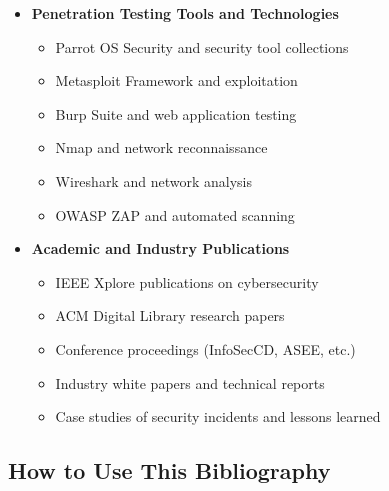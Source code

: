 \begin{itemize}
\item \textbf{Penetration Testing Tools and Technologies}
\begin{itemize}
\item Parrot OS Security and security tool collections
\item Metasploit Framework and exploitation
\item Burp Suite and web application testing
\item Nmap and network reconnaissance
\item Wireshark and network analysis
\item OWASP ZAP and automated scanning
\end{itemize}

\item \textbf{Academic and Industry Publications}
\begin{itemize}
\item IEEE Xplore publications on cybersecurity
\item ACM Digital Library research papers
\item Conference proceedings (InfoSecCD, ASEE, etc.)
\item Industry white papers and technical reports
\item Case studies of security incidents and lessons learned
\end{itemize}

\end{itemize}

\subsection{How to Use This Bibliography}

